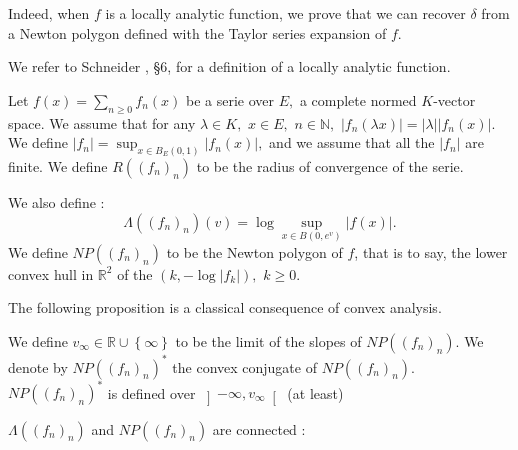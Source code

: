 \documentclass{lms}
\begin{document}
Indeed, when $f$ is a locally analytic function, we prove that we can recover $\delta$ from a Newton polygon defined with the Taylor series expansion of $f.$

We refer to Schneider \cite{schneider:11a}, \S 6, for a definition of a locally analytic function.

\begin{deftn} \label{deftn :  serie and norm}
Let $f(x)= \sum_{n \geq 0} f_n (x)$ be a serie over $E,$ a complete normed $K$-vector space. We assume that for any $\lambda  \in K,$ $x \in E,$ $n \in \mathbb{N},$ $\vert f_n(\lambda x) \vert = \vert \lambda \vert \vert f_n (x) \vert.$ 
We define $\vert f_n \vert = \sup_{x \in B_E(0,1)} \vert f_n(x) \vert,$ and we assume that all the $\vert f_n \vert $ are finite. We define $R((f_n)_n)$ to be the radius of convergence of the serie.

We also define : \[\Lambda((f_n)_n) (v) = \log \sup_{x \in B(0,e^v)} \vert f(x) \vert.\]
We define  $NP((f_n)_n)$ to be the Newton polygon of $f$, that is to say, the lower convex hull in $\mathbb{R}^2$ of the $(k, - \log \vert f_k \vert ),$ $k\geq 0.$ 
\end{deftn}

The following proposition is a classical consequence of convex analysis.

\begin{prop} \label{prop : conjugate Newton}
We define $v_\infty \in \mathbb{R} \cup \left\lbrace \infty \right\rbrace$ to be the limit of the slopes of $NP((f_n)_n).$
We denote by $NP((f_n)_n)^*$ the convex conjugate of $NP((f_n)_n).$ $NP((f_n)_n)^*$ is defined over $\left] -\infty,v_{\infty} \right[$ (at least)
\end{prop}

$\Lambda((f_n)_n)$ and $NP((f_n)_n)$ are connected :
\end{document}
